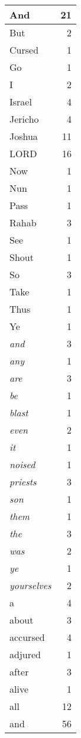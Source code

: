 \begin{center}
\begin{longtable}{l|r}
\hline \hline
\endlastfoot
And & 21 \\ \hline
But & 2 \\ \hline
Cursed & 1 \\ \hline
Go & 1 \\ \hline
I & 2 \\ \hline
Israel & 4 \\ \hline
Jericho & 4 \\ \hline
Joshua & 11 \\ \hline
LORD & 16 \\ \hline
Now & 1 \\ \hline
Nun & 1 \\ \hline
Pass & 1 \\ \hline
Rahab & 3 \\ \hline
See & 1 \\ \hline
Shout & 1 \\ \hline
So & 3 \\ \hline
Take & 1 \\ \hline
Thus & 1 \\ \hline
Ye & 1 \\ \hline
\emph{and} & 3 \\ \hline
\emph{any} & 1 \\ \hline
\emph{are} & 3 \\ \hline
\emph{be} & 1 \\ \hline
\emph{blast} & 1 \\ \hline
\emph{even} & 2 \\ \hline
\emph{it} & 1 \\ \hline
\emph{noised} & 1 \\ \hline
\emph{priests} & 3 \\ \hline
\emph{son} & 1 \\ \hline
\emph{them} & 1 \\ \hline
\emph{the} & 3 \\ \hline
\emph{was} & 2 \\ \hline
\emph{ye} & 1 \\ \hline
\emph{yourselves} & 2 \\ \hline
a & 4 \\ \hline
about & 3 \\ \hline
accursed & 4 \\ \hline
adjured & 1 \\ \hline
after & 3 \\ \hline
alive & 1 \\ \hline
all & 12 \\ \hline
and & 56 \\ \hline

\end{longtable}
\end{center}
